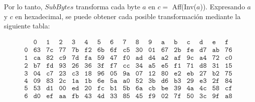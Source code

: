 Por lo tanto, $SubBytes$ transforma cada byte $a$ en $c =$ Aff(Inv($a$)). Expresando $a$ y $c$ en hexadecimal, se puede obtener cada posible transformación mediante la siguiente tabla:

\begin{table}[H]
\centering
\vspace{-1em}
\[
\begin{array}{c|*{16}{c}}
  & \texttt{0} & \texttt{1} & \texttt{2} & \texttt{3} & \texttt{4} & \texttt{5} & \texttt{6} & \texttt{7} & \texttt{8} & \texttt{9} & \texttt{a} & \texttt{b} & \texttt{c} & \texttt{d} & \texttt{e} & \texttt{f} \\ \hline
\texttt{0} & \texttt{63} & \texttt{7c} & \texttt{77} & \texttt{7b} & \texttt{f2} & \texttt{6b} & \texttt{6f} & \texttt{c5} & \texttt{30} & \texttt{01} & \texttt{67} & \texttt{2b} & \texttt{fe} & \texttt{d7} & \texttt{ab} & \texttt{76} \\
\texttt{1} & \texttt{ca} & \texttt{82} & \texttt{c9} & \texttt{7d} & \texttt{fa} & \texttt{59} & \texttt{47} & \texttt{f0} & \texttt{ad} & \texttt{d4} & \texttt{a2} & \texttt{af} & \texttt{9c} & \texttt{a4} & \texttt{72} & \texttt{c0} \\
\texttt{2} & \texttt{b7} & \texttt{fd} & \texttt{93} & \texttt{26} & \texttt{36} & \texttt{3f} & \texttt{f7} & \texttt{cc} & \texttt{34} & \texttt{a5} & \texttt{e5} & \texttt{f1} & \texttt{71} & \texttt{d8} & \texttt{31} & \texttt{15} \\
\texttt{3} & \texttt{04} & \texttt{c7} & \texttt{23} & \texttt{c3} & \texttt{18} & \texttt{96} & \texttt{05} & \texttt{9a} & \texttt{07} & \texttt{12} & \texttt{80} & \texttt{e2} & \texttt{eb} & \texttt{27} & \texttt{b2} & \texttt{75} \\
\texttt{4} & \texttt{09} & \texttt{83} & \texttt{2c} & \texttt{1a} & \texttt{1b} & \texttt{6e} & \texttt{5a} & \texttt{a0} & \texttt{52} & \texttt{3b} & \texttt{d6} & \texttt{b3} & \texttt{29} & \texttt{e3} & \texttt{2f} & \texttt{84} \\
\texttt{5} & \texttt{53} & \texttt{d1} & \texttt{00} & \texttt{ed} & \texttt{20} & \texttt{fc} & \texttt{b1} & \texttt{5b} & \texttt{6a} & \texttt{cb} & \texttt{be} & \texttt{39} & \texttt{4a} & \texttt{4c} & \texttt{58} & \texttt{cf} \\
\texttt{6} & \texttt{d0} & \texttt{ef} & \texttt{aa} & \texttt{fb} & \texttt{43} & \texttt{4d} & \texttt{33} & \texttt{85} & \texttt{45} & \texttt{f9} & \texttt{02} & \texttt{7f} & \texttt{50} & \texttt{3c} & \texttt{9f} & \texttt{a8} \\

\end{array}\]
\end{table}
